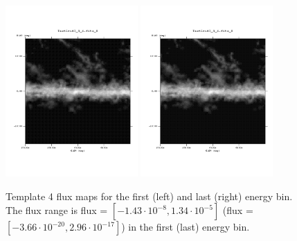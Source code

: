 \documentclass{article}
\begin{document}
\begin{figure}
\centering
\includegraphics[trim = 50 100 70 100, clip = true, width=0.45\textwidth]{figs/Template_maps/Template4_Ebin01}
\includegraphics[trim = 50 100 70 100, clip = true, width=0.45\textwidth]{figs/Template_maps/Template4_Ebin71}
\caption{Template 4 flux maps for the first (left) and last (right) energy bin. The flux range is flux = $[-1.43 \cdot 10^{-8}, 1.34 \cdot 10^{-5}]$ (flux = $[-3.66 \cdot 10^{-20}, 2.96 \cdot 10^{-17}]$) in the first (last) energy bin.}
\end{figure}
\end{document}
